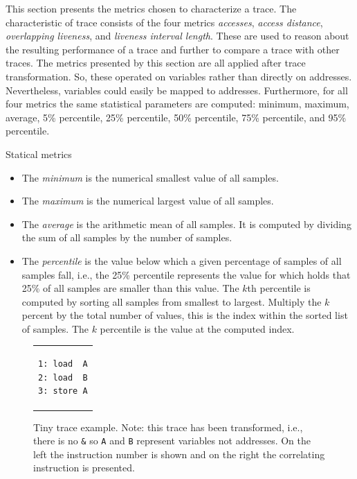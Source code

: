\documentclass[onecolumn, openright, master, english, signatures]{dbrgrptt}
\begin{document}
This section presents the metrics chosen to characterize a \ac{trace}. The characteristic of \ac{trace} consists of the four metrics \emph{accesses}, \emph{access distance}, \emph{overlapping liveness}, and \emph{liveness interval length}. These are used to reason about the resulting performance of a \ac{trace} and further to compare a \ac{trace} with other \ac{trace}s. The metrics presented by this section are all applied after \ac{trace} transformation. So, these operated on variables rather than directly on addresses. Nevertheless, variables could easily be mapped to addresses. Furthermore, for all four metrics the same statistical parameters are computed: minimum, maximum, average, 5\% percentile, 25\% percentile, 50\% percentile, 75\% percentile, and 95\% percentile.

\begin{remark} Statical metrics\
\begin{itemize}
\item The \emph{minimum} is the numerical smallest value of all samples.
\item The \emph{maximum} is the numerical largest value of all samples.
\item The \emph{average} is the arithmetic mean of all samples. It is computed by dividing the sum of all samples by the number of samples.
\item The \emph{percentile} is the value below which a given percentage of samples of all samples fall, i.e., the 25\% percentile represents the value for which holds that 25\% of all samples are smaller than this value. The $k$th percentile is computed by sorting all samples from smallest to largest. Multiply the $k$ percent by the total number of values, this is the index within the sorted list of samples. The $k$ percentile is the value at the computed index.
\end{itemize}
\end{remark}

\begin{figure}[!ht]
  \centering
  \begin{tabular}{c}
  \begin{lstlisting}
1: load  A
2: load  B
3: store A
  \end{lstlisting}
  \end{tabular}
  \caption{Tiny \ac{trace} example. Note: this trace has been transformed, i.e., there is no \texttt{\&} so \texttt{A} and \texttt{B} represent variables not addresses. On the left the instruction number is shown and on the right the correlating instruction is presented.}
  \label{fig:metrics-exmaple}
\end{figure}
\end{document}
